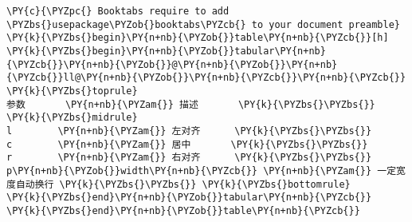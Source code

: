 \begin{Verbatim}[commandchars=\\\{\}]
\PY{c}{\PYZpc{} Booktabs require to add \PYZbs{}usepackage\PYZob{}booktabs\PYZcb{} to your document preamble}
\PY{k}{\PYZbs{}begin}\PY{n+nb}{\PYZob{}}table\PY{n+nb}{\PYZcb{}}[h]
\PY{k}{\PYZbs{}begin}\PY{n+nb}{\PYZob{}}tabular\PY{n+nb}{\PYZcb{}}\PY{n+nb}{\PYZob{}}@\PY{n+nb}{\PYZob{}}\PY{n+nb}{\PYZcb{}}ll@\PY{n+nb}{\PYZob{}}\PY{n+nb}{\PYZcb{}}\PY{n+nb}{\PYZcb{}}
\PY{k}{\PYZbs{}toprule}
参数       \PY{n+nb}{\PYZam{}} 描述       \PY{k}{\PYZbs{}\PYZbs{}} \PY{k}{\PYZbs{}midrule}
l        \PY{n+nb}{\PYZam{}} 左对齐      \PY{k}{\PYZbs{}\PYZbs{}}
c        \PY{n+nb}{\PYZam{}} 居中       \PY{k}{\PYZbs{}\PYZbs{}}
r        \PY{n+nb}{\PYZam{}} 右对齐      \PY{k}{\PYZbs{}\PYZbs{}}
p\PY{n+nb}{\PYZob{}}width\PY{n+nb}{\PYZcb{}} \PY{n+nb}{\PYZam{}} 一定宽度自动换行 \PY{k}{\PYZbs{}\PYZbs{}} \PY{k}{\PYZbs{}bottomrule}
\PY{k}{\PYZbs{}end}\PY{n+nb}{\PYZob{}}tabular\PY{n+nb}{\PYZcb{}}
\PY{k}{\PYZbs{}end}\PY{n+nb}{\PYZob{}}table\PY{n+nb}{\PYZcb{}}
\end{Verbatim}
